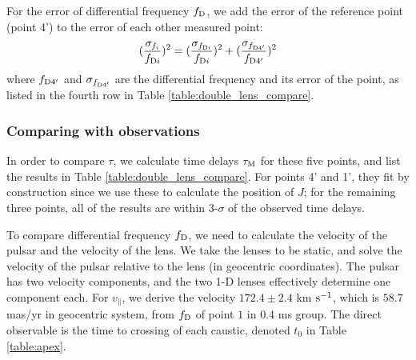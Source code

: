 \documentclass[useAMS,usenatbib]{mn2e}
\begin{document}
For the error of differential frequency $f_{\rm D}$, we add the error of the reference point (point 4') to the error of each other measured point:
\begin{equation}
\begin{aligned}
(\frac{\sigma_{f_i}}{f_{{\rm D}i}})^2=(\frac{\sigma_{f_{{\rm D}i}}}{f_{{\rm D}i}})^2+(\frac{\sigma_{f_{{\rm D}4'}}}{f_{{\rm D}4'}})^2
\end{aligned}
\end{equation}
where $f_{{\rm D}4'}$ and $\sigma_{f_{{\rm D}4'}}$ are the differential frequency
and its error of the point, as listed in the fourth row in Table
\ref{table:double_lens_compare}.

\subsubsection{Comparing with observations}
In order to compare $\tau$, we calculate time delays $\tau_{\rm M}$ for these five
points, and list the results in Table
\ref{table:double_lens_compare}. For points 4' and 1', they fit by
construction since we use these to calculate the position of $J$; for the remaining three points, all of the results are within 3-$\sigma$ of the observed time delays.

To compare differential frequency $f_{\rm D}$, we need to calculate the velocity of the pulsar and the velocity of the lens. We take the lenses to be static, and solve the velocity of the pulsar relative to the lens (in geocentric coordinates). The pulsar has two velocity components, and the two 1-D lenses effectively determine one component each.
For $v_{\parallel}$, we derive the velocity $172.4 \pm 2.4$ km $\rm s^{-1}$, 
which is $58.7$ mas/yr in geocentric system, 
from $f_{\rm D}$ of point $1$ in $0.4$ ms group.  The direct observable is the time to crossing of each caustic, denoted $t_0$ in Table \ref{table:apex}. 
\end{document}
